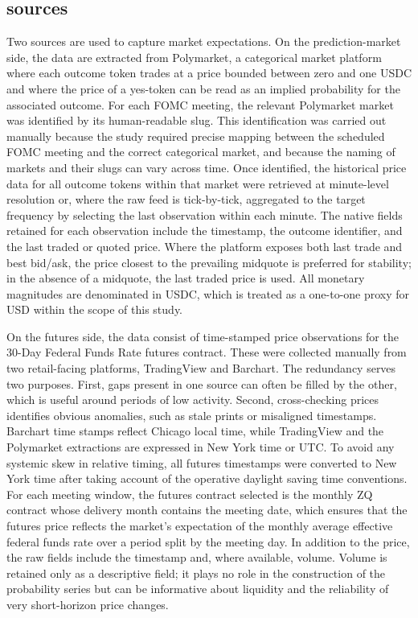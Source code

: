 \subsection{sources}

Two sources are used to capture market expectations. On the prediction-market side, the data are extracted from Polymarket, a categorical market platform where each outcome token trades at a price bounded between zero and one USDC and where the price of a yes-token can be read as an implied probability for the associated outcome. For each FOMC meeting, the relevant Polymarket market was identified by its human-readable slug. This identification was carried out manually because the study required precise mapping between the scheduled FOMC meeting and the correct categorical market, and because the naming of markets and their slugs can vary across time. Once identified, the historical price data for all outcome tokens within that market were retrieved at minute-level resolution or, where the raw feed is tick-by-tick, aggregated to the target frequency by selecting the last observation within each minute. The native fields retained for each observation include the timestamp, the outcome identifier, and the last traded or quoted price. Where the platform exposes both last trade and best bid/ask, the price closest to the prevailing midquote is preferred for stability; in the absence of a midquote, the last traded price is used. All monetary magnitudes are denominated in USDC, which is treated as a one-to-one proxy for USD within the scope of this study.

On the futures side, the data consist of time-stamped price observations for the 30-Day Federal Funds Rate futures contract. These were collected manually from two retail-facing platforms, TradingView and Barchart. The redundancy serves two purposes. First, gaps present in one source can often be filled by the other, which is useful around periods of low activity. Second, cross-checking prices identifies obvious anomalies, such as stale prints or misaligned timestamps. Barchart time stamps reflect Chicago local time, while TradingView and the Polymarket extractions are expressed in New York time or UTC. To avoid any systemic skew in relative timing, all futures timestamps were converted to New York time after taking account of the operative daylight saving time conventions. For each meeting window, the futures contract selected is the monthly ZQ contract whose delivery month contains the meeting date, which ensures that the futures price reflects the market’s expectation of the monthly average effective federal funds rate over a period split by the meeting day. In addition to the price, the raw fields include the timestamp and, where available, volume. Volume is retained only as a descriptive field; it plays no role in the construction of the probability series but can be informative about liquidity and the reliability of very short-horizon price changes.

